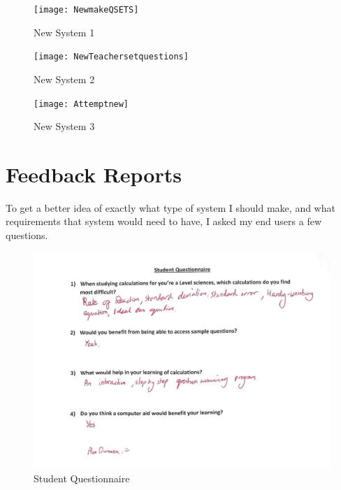 \documentclass[a4paper,12pt]{report}
\begin{document}
\begin{figure}
\centering
\centerline{\texttt{[image: NewmakeQSETS]}}
\caption{New System 1}
\label{fig:newsystem1}
\end{figure}

\begin{figure}
\centering
\centerline{\texttt{[image: NewTeachersetquestions]}}
\caption{New System 2}
\label{fig:newsystem2}
\end{figure}

\begin{figure}
\centering
\centerline{\texttt{[image: Attemptnew]}}
\caption{New System 3}
\label{fig:newsystem3}
\end{figure}

\section{Feedback Reports}
To get a better idea of exactly what type of system I should make, and what requirements that system would need to have, I asked my end users a few questions.
\begin{figure}[h]
\centering
\includegraphics{StudentQuestionnaire}
\caption{Student Questionnaire}
\label{fig:sQuestionnaire}
\end{figure}
\end{document}
